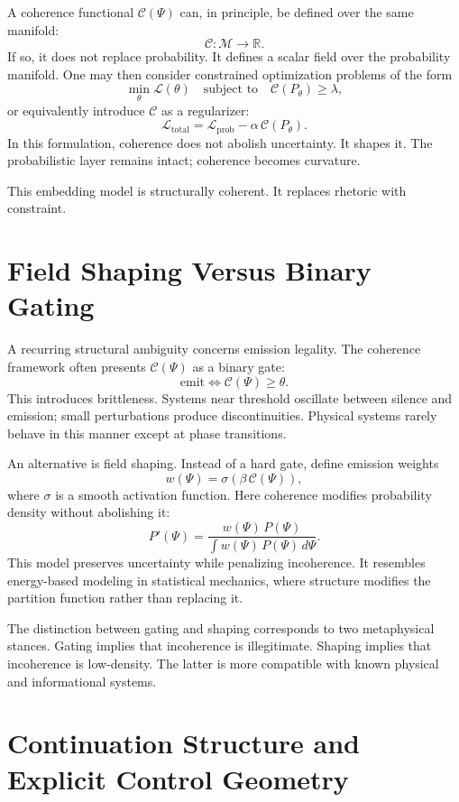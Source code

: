 \documentclass[12pt]{article}
\begin{document}
A coherence functional $\mathcal{C}(\Psi)$ can, in principle, be defined over the same manifold:
\[
  \mathcal{C} : \mathcal{M} \to \mathbb{R}.
\]
If so, it does not replace probability. It defines a scalar field over the probability manifold. One may then consider constrained optimization problems of the form
\[
  \min_\theta \mathcal{L}(\theta)
  \quad \text{subject to} \quad
  \mathcal{C}(P_\theta) \geq \lambda,
\]
or equivalently introduce $\mathcal{C}$ as a regularizer:
\[
  \mathcal{L}_{\text{total}} = 
  \mathcal{L}_{\text{prob}} - \alpha \,\mathcal{C}(P_\theta).
\]
In this formulation, coherence does not abolish uncertainty. It shapes it. The probabilistic layer remains intact; coherence becomes curvature.

This embedding model is structurally coherent. It replaces rhetoric with constraint.

\section{Field Shaping Versus Binary Gating}

A recurring structural ambiguity concerns emission legality. The coherence framework often presents $\mathcal{C}(\Psi)$ as a binary gate:
\[
  \text{emit} \iff \mathcal{C}(\Psi) \geq \theta.
\]
This introduces brittleness. Systems near threshold oscillate between silence and emission; small perturbations produce discontinuities. Physical systems rarely behave in this manner except at phase transitions.

An alternative is field shaping. Instead of a hard gate, define emission weights
\[
  w(\Psi) = \sigma(\beta \,\mathcal{C}(\Psi)),
\]
where $\sigma$ is a smooth activation function. Here coherence modifies probability density without abolishing it:
\[
  P'(\Psi) = \frac{w(\Psi)\,P(\Psi)}{\int w(\Psi)\,P(\Psi)\,d\Psi}.
\]
This model preserves uncertainty while penalizing incoherence. It resembles energy-based modeling in statistical mechanics, where structure modifies the partition function rather than replacing it.

The distinction between gating and shaping corresponds to two metaphysical stances. Gating implies that incoherence is illegitimate. Shaping implies that incoherence is low-density. The latter is more compatible with known physical and informational systems.

\section{Continuation Structure and Explicit Control Geometry}
\end{document}
